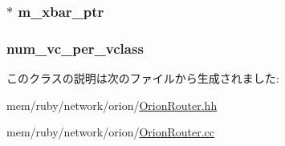 \label{classOrionRouter_a58d6bd12415b8151cdaf29b4cfa244f0}
\hypertarget{classOrionRouter_a86f2265e1c20536cbb514637c6e82dea}{
\subsubsection[{m\_\-xbar\_\-ptr}]{$\ast$ {\bf m\_\-xbar\_\-ptr}}}
\label{classOrionRouter_a86f2265e1c20536cbb514637c6e82dea}
\hypertarget{classOrionRouter_a00f9979941e10e772e291dae66cbe340}{
\subsubsection[{num\_\-vc\_\-per\_\-vclass}]{ {\bf num\_\-vc\_\-per\_\-vclass}}}
\label{classOrionRouter_a00f9979941e10e772e291dae66cbe340}


このクラスの説明は次のファイルから生成されました:\begin{DoxyCompactItemize}
\item 
mem/ruby/network/orion/\hyperlink{OrionRouter_8hh}{OrionRouter.hh}\item 
mem/ruby/network/orion/\hyperlink{OrionRouter_8cc}{OrionRouter.cc}\end{DoxyCompactItemize}
